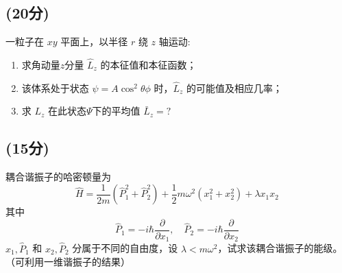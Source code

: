 \subsection{(20分)}
一粒子在 $xy$ 平面上，以半径 $r$ 绕 $z$ 轴运动:
\begin{enumerate}
  \item 求角动量$z$分量 $\hat{L}_z$ 的本征值和本征函数；
  \item 该体系处于状态 $\psi = A \cos^2 \theta \phi$ 时，$\hat{L}_z$ 的可能值及相应几率；
  \item 求 $L_z$ 在此状态$\Psi$下的平均值 $\bar{L}_z = ?$
\end{enumerate}
\subsection{(15分)}
耦合谐振子的哈密顿量为
\[\hat{H} = \frac{1}{2m}(\hat{P}_1^2 + \hat{P}_2^2) + \frac{1}{2} m \omega^2 (x_1^2 + x_2^2) + \lambda x_1 x_2~\]
其中
\[\hat{P}_1 = -i \hbar \frac{\partial}{\partial x_1}, \quad \hat{P}_2 = -i \hbar \frac{\partial}{\partial x_2}~\]
$x_1, \hat{P}_1$ 和 $x_2, \hat{P}_2$ 分属于不同的自由度，设 $\lambda < m\omega^2$，试求该耦合谐振子的能级。（可利用一维谐振子的结果）